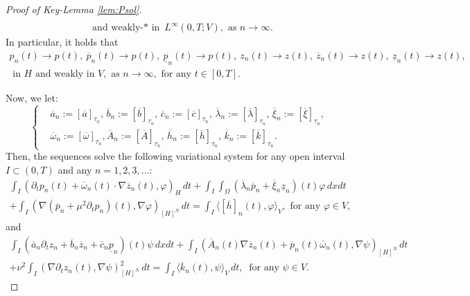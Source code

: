 \documentclass{sinst}
\numberwithin{equation}{section}
\theoremstyle{plain}
\theoremstyle{definition}
\begin{document}
\begin{proof}[Proof of Key-Lemma \ref{lem:Psol}]
\begin{gather}
    \\
    \mbox{ and weakly-$*$ in } L^\infty(0,T;V), \mbox{ as } n \to \infty. \label{P_sol_conv2}
  \end{gather}
  In particular, it holds that
  \begin{gather}
    p_n(t) \to p(t), \ \overline{p}_n(t) \to p(t), \ \underline{p}_n(t) \to p(t), \ z_n(t) \to z(t), \ \overline{z}_n(t) \to z(t), \ \underline{z}_n(t) \to z(t),
    \\
    \mbox{ in } H \mbox{ and weakly in } V, \mbox{ as } n \to \infty, \mbox{ for any } t \in [0,T].
  \end{gather}

  Now, we let:
  \begin{equation}
    \left\{ \begin{aligned}
      &\overline{a}_n := [\overline{a}]_{\tau_n}, \, \overline{b}_n := [\overline{b}]_{\tau_n}, \, \overline{c}_n := [\overline{c}]_{\tau_n}, \, \overline{\lambda}_n := [\overline{\lambda}]_{\tau_n}, \, \overline{\xi}_n := [\overline{\xi}]_{\tau_n}, \, 
      \\
      &\overline{\omega}_n := [\overline{\omega}]_{\tau_n}, \overline{A}_n := [\overline{A}]_{\tau_n}, \, \overline{h}_n := [\overline{h}]_{\tau_n}, \, \overline{k}_n := [\overline{k}]_{\tau_n}.
    \end{aligned} \right.
  \end{equation}
  Then, the sequences solve the following variational system for any open interval $I \subset (0,T)$ and any $n = 1,2,3,\dots$:
  \begin{gather}
    \int_I (\partial_t p_n(t) + \overline{\omega}_n(t) \cdot \nabla \overline{z}_n(t), \varphi)_H \,dt + \int_I \int_\Omega (\overline{\lambda}_n \overline{p}_n + \overline{\xi}_n \underline{z}_n)(t) \varphi \,dxdt
    \\
    + \int_I (\nabla (\overline{p}_n + \mu^2 \partial_t p_n)(t), \nabla \varphi)_{[H]^N}\,dt = \int_I \langle [\overline{h}]_n(t), \varphi \rangle_V, \mbox{ for any } \varphi \in V,
  \end{gather}
  and
  \begin{gather}
    \int_I (\overline{a}_n \partial_t z_n + \overline{b}_n \overline{z}_n + \overline{c}_n \underline{p}_n)(t) \psi \,dxdt + \int_I (\overline{A}_n(t) \nabla \overline{z}_n(t) + \overline{p}_n(t)\overline{\omega}_n(t), \nabla \psi)_{[H]^N} \,dt
    \\
    + \nu^2 \int_I (\nabla \partial_t z_n(t), \nabla \psi)_{[H]^N}^2 \,dt = \int_I \langle \overline{k}_n(t), \psi \rangle_V \,dt, \ \mbox{ for any } \psi \in V.

\end{gather}
\end{proof}
\end{document}
